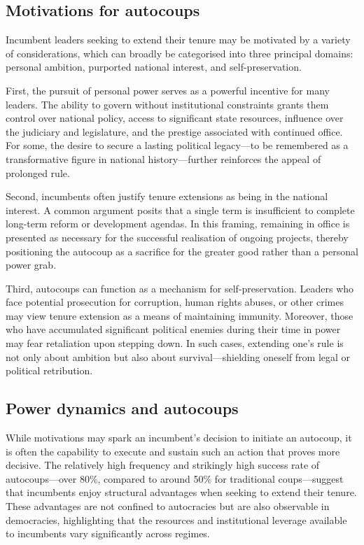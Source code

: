 \documentclass[
  12pt,
]{report}
\begin{document}
\subsection*{Motivations for autocoups}\label{motivations-for-autocoups}

Incumbent leaders seeking to extend their tenure may be motivated by a
variety of considerations, which can broadly be categorised into three
principal domains: personal ambition, purported national interest, and
self-preservation.

First, the pursuit of personal power serves as a powerful incentive for
many leaders. The ability to govern without institutional constraints
grants them control over national policy, access to significant state
resources, influence over the judiciary and legislature, and the
prestige associated with continued office. For some, the desire to
secure a lasting political legacy---to be remembered as a transformative
figure in national history---further reinforces the appeal of prolonged
rule.

Second, incumbents often justify tenure extensions as being in the
national interest. A common argument posits that a single term is
insufficient to complete long-term reform or development agendas. In
this framing, remaining in office is presented as necessary for the
successful realisation of ongoing projects, thereby positioning the
autocoup as a sacrifice for the greater good rather than a personal
power grab.

Third, autocoups can function as a mechanism for self-preservation.
Leaders who face potential prosecution for corruption, human rights
abuses, or other crimes may view tenure extension as a means of
maintaining immunity. Moreover, those who have accumulated significant
political enemies during their time in power may fear retaliation upon
stepping down. In such cases, extending one's rule is not only about
ambition but also about survival---shielding oneself from legal or
political retribution.

\subsection*{Power dynamics and
autocoups}\label{power-dynamics-and-autocoups}

While motivations may spark an incumbent's decision to initiate an
autocoup, it is often the capability to execute and sustain such an
action that proves more decisive. The relatively high frequency and
strikingly high success rate of autocoups---over 80\%, compared to
around 50\% for traditional coups---suggest that incumbents enjoy
structural advantages when seeking to extend their tenure. These
advantages are not confined to autocracies but are also observable in
democracies, highlighting that the resources and institutional leverage
available to incumbents vary significantly across regimes.
\end{document}

